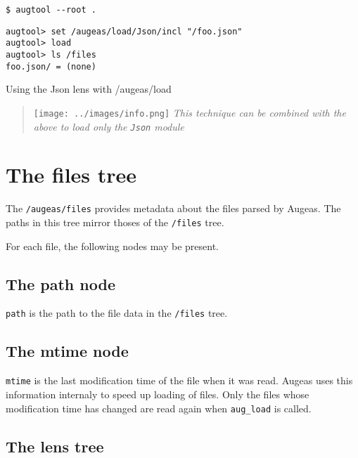    

\begin{listing}
  \begin{verbatim}
$ augtool --root .
  \end{verbatim}
  \begin{verbatim}
augtool> set /augeas/load/Json/incl "/foo.json"
augtool> load
augtool> ls /files
foo.json/ = (none)
  \end{verbatim}
  \caption{Using the Json lens with /augeas/load}
  \label{lst:metadata_json_lens}
\end{listing}

\begin{quote}
\texttt{[image: ../images/info.png]} \emph{This technique can be combined with the above to load only the \texttt{Json} module}

\end{quote}
\section{The files tree}


The \nolinkurl{/augeas/files} provides metadata about the files parsed by Augeas. The paths in this tree mirror thoses of the \nolinkurl{/files} tree.

For each file, the following nodes may be present.

\subsection{The path node}

\verb!path! is the path to the file data in the \nolinkurl{/files} tree.

\subsection{The mtime node}

\verb!mtime! is the last modification time of the file when it was read. Augeas uses this information internaly to speed up loading of files. Only the files whose modification time has changed are read again when \verb!aug_load! is called.

\subsection{The lens tree}

